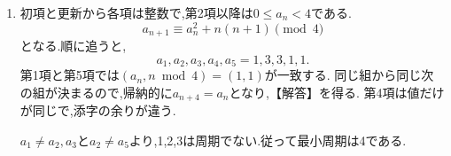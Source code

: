 \noindent {}\par\nobreak
\begin{enumerate}[label=(\arabic*),parsep=3pt,beginpenalty=10000,format=\bookitemlink{example-gauss-role-3}{solution}{problem}]
  \item 初項と更新から各項は整数で,第2項以降は$0\le a_n<4$である.
    \[
      a_{n+1}\equiv a_n^2+n(n+1)\pmod4
    \]
    となる.順に追うと,
    \[
      a_1,a_2,a_3,a_4,a_5=1,3,3,1,1.
    \]
    第1項と第5項では$(a_n,n\bmod4)=(1,1)$が一致する.
    同じ組から同じ次の組が決まるので,帰納的に$a_{n+4}=a_n$となり,【解答】を得る.
    第4項は値だけが同じで,添字の余りが違う.

    $a_1\ne a_2,a_3$と$a_2\ne a_5$より,1,2,3は周期でない.従って最小周期は4である.
\end{enumerate}
